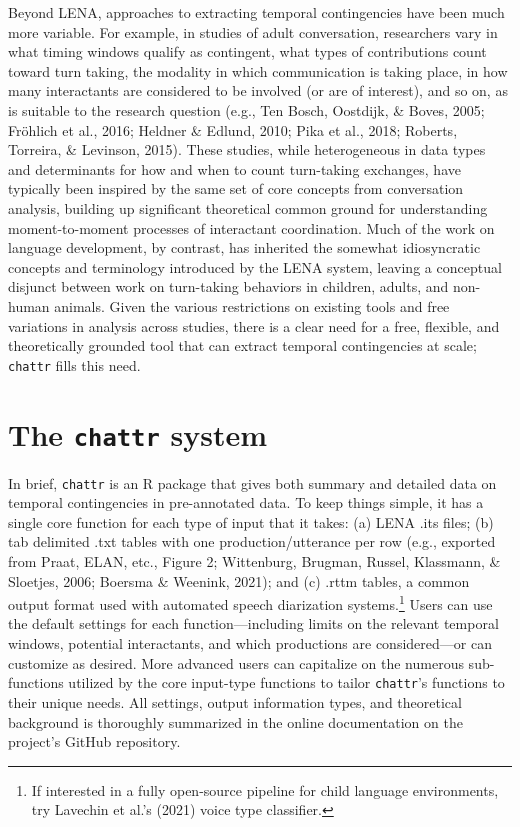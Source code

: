 \documentclass[10pt, letterpaper]{article}
\begin{document}
Beyond LENA, approaches to extracting temporal contingencies have been
much more variable. For example, in studies of adult conversation,
researchers vary in what timing windows qualify as contingent, what
types of contributions count toward turn taking, the modality in which
communication is taking place, in how many interactants are considered
to be involved (or are of interest), and so on, as is suitable to the
research question (e.g., Ten Bosch, Oostdijk, \& Boves, 2005; Fröhlich
et al., 2016; Heldner \& Edlund, 2010; Pika et al., 2018; Roberts,
Torreira, \& Levinson, 2015). These studies, while heterogeneous in data
types and determinants for how and when to count turn-taking exchanges,
have typically been inspired by the same set of core concepts from
conversation analysis, building up significant theoretical common ground
for understanding moment-to-moment processes of interactant
coordination. Much of the work on language development, by contrast, has
inherited the somewhat idiosyncratic concepts and terminology introduced
by the LENA system, leaving a conceptual disjunct between work on
turn-taking behaviors in children, adults, and non-human animals. Given
the various restrictions on existing tools and free variations in
analysis across studies, there is a clear need for a free, flexible, and
theoretically grounded tool that can extract temporal contingencies at
scale; \texttt{chattr} fills this need.

\hypertarget{the-chattr-system}{%
\section{\texorpdfstring{The \texttt{chattr}
system}{The chattr system}}\label{the-chattr-system}}

In brief, \texttt{chattr} is an R package that gives both summary and
detailed data on temporal contingencies in pre-annotated data. To keep
things simple, it has a single core function for each type of input that
it takes: (a) LENA .its files; (b) tab delimited .txt tables with one
production/utterance per row (e.g., exported from Praat, ELAN, etc.,
Figure 2; Wittenburg, Brugman, Russel, Klassmann, \& Sloetjes, 2006;
Boersma \& Weenink, 2021); and (c) .rttm tables, a common output format
used with automated speech diarization systems.\footnote{If interested
  in a fully open-source pipeline for child language environments, try
  Lavechin et al.'s (2021) voice type classifier.} Users can use the
default settings for each function---including limits on the relevant
temporal windows, potential interactants, and which productions are
considered---or can customize as desired. More advanced users can
capitalize on the numerous sub-functions utilized by the core input-type
functions to tailor \texttt{chattr}'s functions to their unique needs.
All settings, output information types, and theoretical background is
thoroughly summarized in the online documentation on the project's
GitHub repository.
\end{document}
